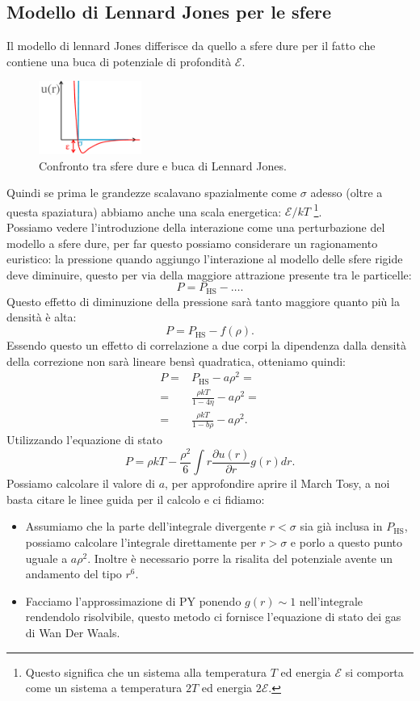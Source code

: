 \subsection{Modello di Lennard Jones per le sfere}
\label{subsec:Modello di Lennard Jones per le sfere}
Il modello di lennard Jones differisce da quello a sfere dure per il fatto che contiene una buca di potenziale di profondità $\mathcal{E}$.
\begin{figure}[H]
	\centering
	\includegraphics[width=0.3\textwidth]{figures/buca-Lennard-Jones.png}
	\caption{Confronto tra sfere dure e buca di Lennard Jones.}
	\label{fig:figures-buca-Lennard-Jones-png}
\end{figure}
Quindi se prima le grandezze scalavano spazialmente come $\sigma$ adesso (oltre a questa spaziatura) abbiamo anche una scala energetica: $\mathcal{E}/kT$ \footnote{Questo significa che un sistema alla temperatura $T$ ed energia $\mathcal{E}$ si comporta come un sistema a temperatura $2T$ ed energia $2\mathcal{E}$.}.\\
Possiamo vedere l'introduzione della interazione come una perturbazione del modello a sfere dure, per far questo possiamo considerare un ragionamento euristico: 
la pressione quando aggiungo l'interazione al modello delle sfere rigide deve diminuire, questo per via della maggiore attrazione presente tra le particelle:
\[
	P = P_\text{HS} - \ldots
.\] 
Questo effetto di diminuzione della pressione sarà tanto maggiore quanto più la densità è alta: 
\[
	P=P_\text{HS} - f(\rho )
.\] 
Essendo questo un effetto di correlazione a due corpi la dipendenza dalla densità della correzione non sarà lineare bensì quadratica, otteniamo quindi:
\[\begin{aligned}
	P
	=&
	P_\text{HS} - a \rho ^2 =\\
	=&
	\frac{\rho kT}{1-4\eta}-a\rho ^2=\\
	=&\frac{\rho kT}{1-b\rho }-a\rho ^2
.\end{aligned}\]
Utilizzando l'equazione di stato 
\[
	P 
	=
	\rho kT - \frac{\rho ^2}{6}\int r \frac{\partial u(r)}{\partial r} g(r) dr
.\]
Possiamo calcolare il valore di $a$, per approfondire aprire il March Tosy, a noi basta citare le linee guida per il calcolo e ci fidiamo:
\begin{itemize}
	\item Assumiamo che la parte dell'integrale divergente $r<\sigma$ sia già inclusa
		in $P_\text{HS}$, possiamo calcolare l'integrale direttamente per 
		$r>\sigma$ e porlo a questo punto uguale a $a\rho ^2$. Inoltre è
		necessario porre la risalita del potenziale avente un andamento del tipo
		$r^6$.
	\item Facciamo l'approssimazione di PY ponendo $g(r)\sim 1$ nell'integrale 
		rendendolo risolvibile, questo metodo ci fornisce l'equazione di stato 
		dei gas di Wan Der Waals.
\end{itemize}
